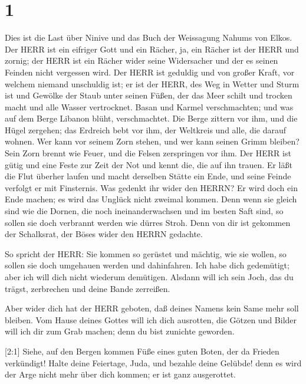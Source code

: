 \hypertarget{section}{%
\section{1}\label{section}}

 Dies ist die Last über Ninive und das Buch der Weissagung
Nahums von Elkos.  Der HERR ist ein eifriger Gott und ein
Rächer, ja, ein Rächer ist der HERR und zornig; der HERR ist ein Rächer
wider seine Widersacher und der es seinen Feinden nicht vergessen wird.
 Der HERR ist geduldig und von großer Kraft, vor welchem
niemand unschuldig ist; er ist der HERR, des Weg in Wetter und Sturm ist
und Gewölke der Staub unter seinen Füßen,  der das Meer
schilt und trocken macht und alle Wasser vertrocknet. Basan und Karmel
verschmachten; und was auf dem Berge Libanon blüht, verschmachtet.
 Die Berge zittern vor ihm, und die Hügel zergehen; das
Erdreich bebt vor ihm, der Weltkreis und alle, die darauf wohnen.
 Wer kann vor seinem Zorn stehen, und wer kann seinen Grimm
bleiben? Sein Zorn brennt wie Feuer, und die Felsen zerspringen vor ihm.
 Der HERR ist gütig und eine Feste zur Zeit der Not und
kennt die, die auf ihn trauen.  Er läßt die Flut überher
laufen und macht derselben Stätte ein Ende, und seine Feinde verfolgt er
mit Finsternis.  Was gedenkt ihr wider den HERRN? Er wird
doch ein Ende machen; es wird das Unglück nicht zweimal kommen.
 Denn wenn sie gleich sind wie die Dornen, die noch
ineinanderwachsen und im besten Saft sind, so sollen sie doch verbrannt
werden wie dürres Stroh.  Denn von dir ist gekommen der
Schalksrat, der Böses wider den HERRN gedachte.

 So spricht der HERR: Sie kommen so gerüstet und mächtig,
wie sie wollen, so sollen sie doch umgehauen werden und dahinfahren. Ich
habe dich gedemütigt; aber ich will dich nicht wiederum demütigen.
 Alsdann will ich sein Joch, das du trägst, zerbrechen und
deine Bande zerreißen.

 Aber wider dich hat der HERR geboten, daß deines Namens
kein Same mehr soll bleiben. Vom Hause deines Gottes will ich dich
ausrotten, die Götzen und Bilder will ich dir zum Grab machen; denn du
bist zunichte geworden.

 {[}2:1{]} Siehe, auf den Bergen kommen Füße eines guten
Boten, der da Frieden verkündigt! Halte deine Feiertage, Juda, und
bezahle deine Gelübde! denn es wird der Arge nicht mehr über dich
kommen; er ist ganz ausgerottet.

